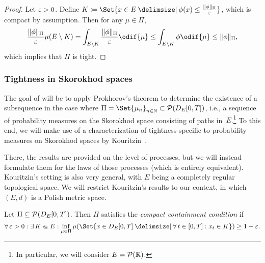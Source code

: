 \begin{proof}
  Let \( \varepsilon > 0 \).
  Define \( K \coloneqq \Set{x \in E \given \phi(x) \leq \frac{\norm{\phi}_\Pi}{\eps}} \), which is compact by assumption.
  Then for any \( \mu \in \Pi \),
  \begin{equation}
    \frac{\norm{\phi}_\Pi}{\eps} \mu(E \setminus K) = \int_{E \setminus K} \frac{\norm{\phi}_\Pi}{\eps} \odif{\mu}
    \leq \int_{E \setminus K} \phi \odif{\mu}
    \leq \norm{\phi}_\Pi,
  \end{equation}
  which implies that \( \Pi \) is tight.
\end{proof}


\subsubsection{Tightness in Skorokhod spaces}\label{subsec:tight-skorok}

The goal of  will be to apply Prokhorov's theorem to determine the existence of a subsequence in the case where \( \Pi = \Set{\mu_n}_{n\in\bN} \subset \cP(D_{E}[0,T]) \), i.e., a sequence of probability measures on the Skorokhod space consisting of paths in~\(E\).\footnote{In particular, we will consider \(E = \mathcal{P}(\mathbb{R})\).}
To this end, we will make use of a characterization of tightness specific to probability measures on Skorokhod spaces by Kouritzin~\cite{kouritzinTightnessProbabilityMeasures2015}.

There, the results are provided on the level of processes, but we will instead formulate them for the laws of those processes (which is entirely equivalent).
Kouritzin's setting is also very general, with \( E \) being a completely regular topological space.
We will restrict Kouritzin's results to our context, in which \((E,d)\) is a Polish metric space.

\begin{definition}[CCC]\label{def:CCC}
  Let \( \Pi \subseteq \mathcal{P}(D_{E}[0,T]) \).
  Then \( \Pi \) satisfies the \textit{compact containment condition} if
  \begin{equation}
    \forall \eps > 0 : \exists K \Subset E : \inf_{\mu \in \Pi} \mu(\Set{x \in D_E[0,T] \given \forall t \in [0,T] : x_t \in K}) \geq 1 - \eps.
  \end{equation}
\end{definition}

